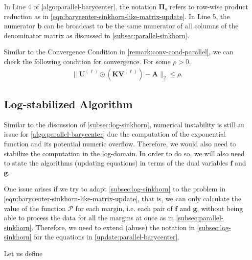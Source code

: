 \begin{remark}[]
  In Line 4 of \cref{algo:parallel-barycenter},
  the notation $\boldsymbol\Pi_s$ refers to row-wise product reduction
  as in \cref{eqn:barycenter-sinkhorn-like-matrix-update}.
  In Line 5, the numerator $\mathbf{b}$ can be broadcast to be the same numerator of all columns of the denominator matrix
  as discussed in \cref{subsec:parallel-sinkhorn}.
\end{remark}

\begin{remark}
  Similar to the Convergence Condition in \cref{remark:conv-cond-parallel},
  we can check the following condition for convergence. For some $\rho > 0$,
  \begin{equation*}
    \begin{aligned}
      \lVert
      \mathbf{U}^{(\ell)} \odot \left(\mathbf{K} \mathbf{V}^{(\ell)}\right) - \mathbf{A}
      \rVert_2 \le \rho.
    \end{aligned}
  \end{equation*}
\end{remark}


\subsection{Log-stabilized Algorithm}\label{subsec:log-barycenter}


Similar to the discussion of \cref{subsec:log-sinkhorn},
numerical instability is still an issue for \cref{algo:parallel-barycenter}
due the computation of the exponential function and its potential numeric overflow.
Therefore, we would also need to stabilize the computation in the log-domain.
In order to do so, we will also need to state the algorithms (updating equations)
in terms of the dual variables $\mathbf{f}$ and $\mathbf{g}$.

One issue arises if we try to adapt \cref{subsec:log-sinkhorn} to the problem in
\cref{eqn:barycenter-sinkhorn-like-matrix-update},
that is,
we can only calculate the value of the function $\mathcal{P}$ for each margin,
i.e. each pair of $\mathbf{f}$ and $\mathbf{g}$,
without being able to process the data for all the margins at once as in \cref{subsec:parallel-sinkhorn}.
Therefore, we need to extend (abuse) the notation in \cref{subsec:log-sinkhorn}
for the equations in \cref{update:parallel-barycenter}.

Let us define

